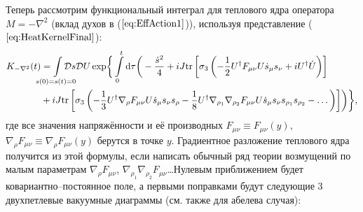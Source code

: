 Теперь рассмотрим функциональный интеграл для теплового ядра оператора $M=-\nabla^2$ (вклад духов в ($\ref{eq:EffAction1}$)), используя представление ($\ref{eq:HeatKernelFinal}$):
\begin{equation}
	\label{eq:intFullGhost}
	\begin{split}
K_{-\nabla^2}(t)&=\mkern-6\thickmuskip\int\limits_{s(0)=s(t)=0}\mkern-6\thickmuskip \mathcal{D}s\mathcal{D}U \exp\biggr\{ \int\limits_0^t \D \tau \biggr(-\frac{\dot{s}^2}{4} + iJ\tr\left[\sigma_3\left( -\frac12 U^\dagger F_{\mu\nu}U \dot{s}_\mu s_\nu + iU^\dagger \dot{U}\right)\right]\\
	&+ iJ\tr\left[ \sigma_3\left( -\frac13 U^\dagger \nabla_\rho F_{\mu \nu}U\dot{s}_\mu s_\nu s_\rho -\frac18 U^\dagger\nabla_{\rho_1}\nabla_{\rho_2}F_{\mu \nu}U\dot{s}_\mu s_\nu s_{\rho_1} s_{\rho_2} - \dots \right) \right] \biggr)\biggr\},
	\end{split}
\end{equation}
где все значения напряжённости и её производных $F_{\mu \nu}\equiv F_{\mu \nu}(y)$, $\nabla_\rho F_{\mu \nu}\equiv \nabla_\rho F_{\mu \nu}(y) $ берутся в точке $y$. Градиентное разложение теплового ядра получится из этой формулы, если написать обычный ряд теории возмущений по малым параметрам $\nabla_\rho F_{\mu \nu}$, $\nabla_{\rho_1}\nabla_{\rho_2} F_{\mu \nu}$\dots Нулевым приближением будет ковариантно--постоянное поле, а первыми поправками будут следующие 3 двухпетлевые вакуумные диаграммы (см. также \cite{Mnev} для абелева случая):
